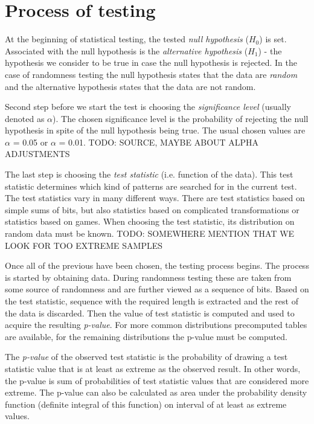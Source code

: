 \documentclass[
  digital,     %
  oneside,     %
  nosansbold,  %
  nocolorbold, %
  nolof,         %
  nolot,         %
]{fithesis4}
\begin{document}
\section{Process of testing} \label{chap:rand-process}

At the beginning of statistical testing, the tested \emph{null hypothesis}  ($H_0$) is set. Associated with the null hypothesis is the \emph{alternative hypothesis} ($H_1$) - the hypothesis we consider to be true in case the null hypothesis is rejected. In the case of randomness testing the null hypothesis states that the data are \emph{random} and the alternative hypothesis states that the data are not random.

Second step before we start the test is choosing the \emph{significance level} (usually denoted as $\alpha$). The chosen significance level is the probability of rejecting the null hypothesis in spite of the null hypothesis being true. The usual chosen values are $\alpha$ = 0.05 or $\alpha$ = 0.01. TODO: SOURCE, MAYBE ABOUT ALPHA ADJUSTMENTS

The last step is choosing the \emph{test statistic} (i.e. function of the data). This test statistic determines which kind of patterns are searched for in the current test. The test statistics vary in many different ways. There are test statistics based on simple sums of bits, but also statistics based on complicated transformations or statistics based on games. When choosing the test statistic, its distribution on random data must be known. TODO: SOMEWHERE MENTION THAT WE LOOK FOR TOO EXTREME SAMPLES

Once all of the previous have been chosen, the testing process begins. The process is started by obtaining data. During randomness testing these are taken from some source of randomness and are further viewed as a sequence of bits. Based on the test statistic, sequence with the required length is extracted and the rest of the data is discarded. Then the value of test statistic is computed and used to acquire the resulting \emph{p-value}. For more common distributions precomputed tables are available, for the remaining distributions the p-value must be computed.

The \emph{p-value} of the observed test statistic is the probability of drawing a test statistic value that is at least as extreme as the observed result. In other words, the p-value is sum of probabilities of test statistic values that are considered more extreme. The p-value can also be calculated as area under the probability density function (definite integral of this function) on interval of at least as extreme values.
\end{document}
